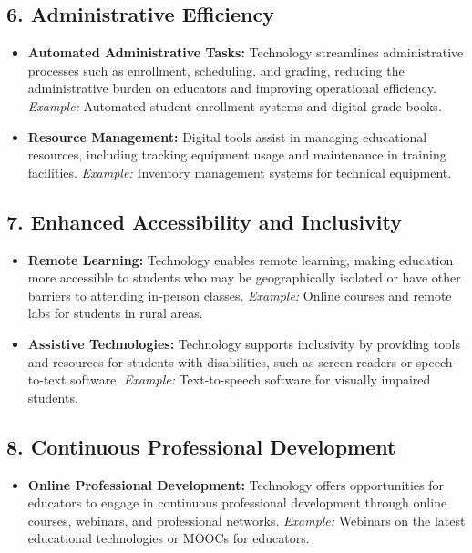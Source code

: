 \documentclass[10pt]{article}
\begin{document}
\subsection*{6. Administrative Efficiency}
\begin{itemize}
    \item \textbf{Automated Administrative Tasks:} Technology streamlines administrative processes such as enrollment, scheduling, and grading, reducing the administrative burden on educators and improving operational efficiency. \textit{Example:} Automated student enrollment systems and digital grade books.
    \item \textbf{Resource Management:} Digital tools assist in managing educational resources, including tracking equipment usage and maintenance in training facilities. \textit{Example:} Inventory management systems for technical equipment.
\end{itemize}

\subsection*{7. Enhanced Accessibility and Inclusivity}
\begin{itemize}
    \item \textbf{Remote Learning:} Technology enables remote learning, making education more accessible to students who may be geographically isolated or have other barriers to attending in-person classes. \textit{Example:} Online courses and remote labs for students in rural areas.
    \item \textbf{Assistive Technologies:} Technology supports inclusivity by providing tools and resources for students with disabilities, such as screen readers or speech-to-text software. \textit{Example:} Text-to-speech software for visually impaired students.
\end{itemize}

\subsection*{8. Continuous Professional Development}
\begin{itemize}
    \item \textbf{Online Professional Development:} Technology offers opportunities for educators to engage in continuous professional development through online courses, webinars, and professional networks. \textit{Example:} Webinars on the latest educational technologies or MOOCs for educators.
\end{itemize}
\end{document}
